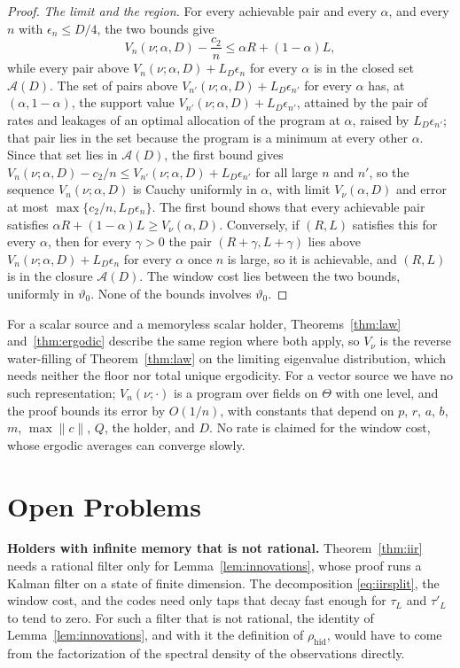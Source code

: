 \documentclass[11pt,onecolumn]{IEEEtran}
\newcommand{\rhid}{\rho_{\mathrm{hid}}}
\begin{document}
\begin{proof}
\emph{The limit and the region.} For every achievable pair and every
$\alpha$, and every $n$ with $\epsilon_n\le D/4$, the two bounds give
\[
V_n(\nu;\alpha,D)-\frac{c_2}n\le\alpha R+(1-\alpha)L,
\]
while every pair above $V_n(\nu;\alpha,D)+L_D\epsilon_n$ for every $\alpha$ is
in the closed set $\mathcal A(D)$. The set of pairs above
$V_{n'}(\nu;\alpha,D)+L_D\epsilon_{n'}$ for every $\alpha$ has, at
$(\alpha,1-\alpha)$, the support value $V_{n'}(\nu;\alpha,D)+L_D\epsilon_{n'}$,
attained by the pair of rates and leakages of an optimal allocation of
the program at $\alpha$, raised by $L_D\epsilon_{n'}$; that pair lies in the
set because the program is a minimum at every other $\alpha$. Since that
set lies in $\mathcal A(D)$, the first bound gives
$V_n(\nu;\alpha,D)-c_2/n\le V_{n'}(\nu;\alpha,D)+L_D\epsilon_{n'}$ for all large
$n$ and $n'$, so the sequence $V_n(\nu;\alpha,D)$ is Cauchy uniformly in
$\alpha$, with limit $V_\nu(\alpha,D)$ and error at most
$\max\{c_2/n,L_D\epsilon_n\}$. The first bound shows that every achievable
pair satisfies $\alpha R+(1-\alpha)L\ge V_\nu(\alpha,D)$. Conversely, if
$(R,L)$ satisfies this for every $\alpha$, then for every $\gamma>0$ the
pair $(R+\gamma,L+\gamma)$ lies above $V_n(\nu;\alpha,D)+L_D\epsilon_n$ for every
$\alpha$ once $n$ is large, so it is achievable, and $(R,L)$ is in the
closure $\mathcal A(D)$. The window cost lies between the two bounds,
uniformly in $\vartheta_0$. None of the bounds involves $\vartheta_0$.
\end{proof}

For a scalar source and a memoryless scalar holder,
Theorems~\ref{thm:law} and~\ref{thm:ergodic} describe the same region
where both apply, so $V_\nu$ is the reverse water-filling of
Theorem~\ref{thm:law} on the limiting eigenvalue distribution, which
needs neither the floor nor total unique ergodicity. For a vector source
we have no such representation; $V_n(\nu;\cdot)$ is a program over
fields on $\Theta$ with one level, and the proof bounds its error by
$O(1/n)$, with constants that depend on $p$, $r$, $a$, $b$, $m$,
$\max\|c\|$, $Q$, the holder, and $D$. No rate is claimed for the window
cost, whose ergodic averages can converge slowly.

\section{Open Problems}
\label{sec:open}

\textbf{Holders with infinite memory that is not rational.}
Theorem~\ref{thm:iir} needs a rational filter only for
Lemma~\ref{lem:innovations}, whose proof runs a Kalman filter on a state
of finite dimension. The decomposition \eqref{eq:iirsplit}, the window
cost, and the codes need only taps that decay fast enough for $\tau_L$
and $\tau'_L$ to tend to zero. For such a filter that is not rational,
the identity of Lemma~\ref{lem:innovations}, and with it the definition
of $\rhid$, would have to come from the factorization of the spectral
density of the observations directly.
\end{document}
